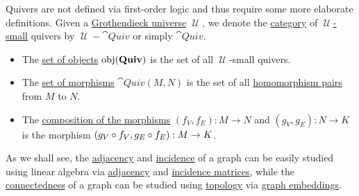 \begin{definition}
\begin{thmenum}
    Quivers are not defined via first-order logic and thus require some more elaborate definitions. Given a \hyperref[def:grothendieck_universe]{Grothendieck universe} \( \mscrU \), we denote the \hyperref[def:category]{category} of \hyperref[def:large_and_small_sets]{\( \mscrU \)-small} quivers by \( \mscrU-\cat{Quiv} \) or simply \( \cat{Quiv} \).
    \begin{itemize}
      \item The \hyperref[def:category/C1]{set of objects} \( \operatorname{obj}(\operatorname{\mathbf{Quiv}}) \) is the set of all \( \mscrU \)-small quivers.
      \item The \hyperref[def:category/C2]{set of morphisms} \( \cat{Quiv}(M, N) \) is the set of all \hyperref[def:theory_of_graphs/quiver_homomorphism]{homomorphism pairs} from \( M \) to \( N \).

      \item The \hyperref[def:category/C3]{composition of the morphisms} \( (f_V, f_E): M \to N \) and \( (g_V, g_E): N \to K \) is the morphism \( (g_V \mathbin \circ f_V, g_E \mathbin \circ f_E): M \to K \).
    \end{itemize}
  \end{thmenum}
\end{definition}

\begin{remark}\label{rem:graphs_linear_algebra_and_topology}
  As we shall see, the \hyperref[def:graph/adjacent_vertices]{adjacency} and \hyperref[def:graph/incidence]{incidence} of a graph can be easily studied using linear algebra via \hyperref[def:graph_adjacency_matrix]{adjacency} and \hyperref[def:multigraph_incidence_matrix]{incidence matrices}, while the \hyperref[def:quiver_connectedness]{connectedness} of a graph can be studied using \hyperref[def:quiver_connectedness]{topology} via \hyperref[def:quiver_geometric_relization/embedding]{graph embeddings}.
\end{remark}

